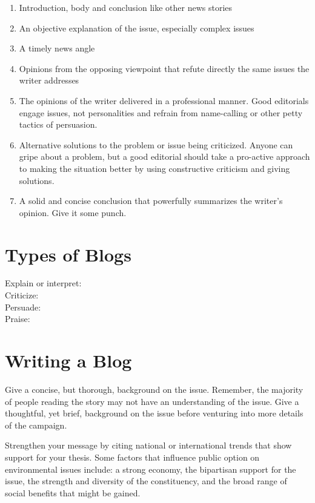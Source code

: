 \documentclass{tufte-handout}\usepackage[]{graphicx}\usepackage[]{color}
\begin{document}
\begin{enumerate}
	\item Introduction, body and conclusion like other news stories
	\item An objective explanation of the issue, especially complex issues
	\item A timely news angle
	\item Opinions from the opposing viewpoint that refute directly the same issues the writer addresses
	\item The opinions of the writer delivered in a professional manner. Good editorials engage issues, not personalities and refrain from name-calling or other petty tactics of persuasion.
	\item Alternative solutions to the problem or issue being criticized. Anyone can gripe about a problem, but a good editorial should take a pro-active approach to making the situation better by using constructive criticism and giving solutions.
	\item A solid and concise conclusion that powerfully summarizes the writer's opinion. Give it some punch.
\end{enumerate}


\section{Types of Blogs}

\begin{description}
	\item[Explain or interpret:] 
	\item[Criticize:] 
	
	\item[Persuade:] 
	
	\item[Praise:] 
	
\end{description}
 

\section{Writing a Blog}

Give a concise, but thorough, background on the issue. Remember, the majority of people reading the story may not have an understanding of the issue. Give a thoughtful, yet brief, background on the issue before venturing into more details of the campaign.

Strengthen your message by citing national or international trends that show support for your thesis. Some factors  that influence public option on environmental issues include: a strong economy, the bipartisan support for the issue, the strength and diversity of the constituency, and the broad range of social benefits that might be gained.
\end{document}

